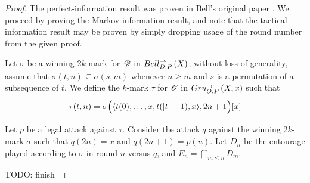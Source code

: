 \documentclass{amsart}
\theoremstyle{definition}
\begin{document}
  \begin{proof}
    The perfect-information result was proven in Bell's
    original paper \cite{MR3239205}. We proceed by proving the
    Markov-information result, and note that the tactical-information
    result may be proven by simply dropping usage of
    the round number from the given proof.

    Let \(\sigma\) be a winning \(2k\)-mark for \(\mathscr{D}\) in
    \(Bell_{D,P}^{\rightharpoonup}\left({X}\right)\); without loss of generality, assume that
    \(\sigma(t,n)\subseteq\sigma(s,m)\) whenever \(n\geq m\) and
    \(s\) is a permutation of a subsequence of \(t\).
    We define the \(k\)-mark \(\tau\) for \(\mathscr{O}\) in
    \(Gru_{O,P}^{\to}\left({X},{x}\right)\) such that
      \[
        \tau(t,n)
          =
        \sigma\Big(\langle t(0),\dots,x,t(|t|-1),x\rangle,2n+1\Big)[x]
      \]

    Let \(p\) be a legal attack against \(\tau\).
    Consider the attack \(q\) against the winning \(2k\)-mark
    \(\sigma\) such that \(q(2n)=x\) and \(q(2n+1)=p(n)\).
    Let \(D_n\) be the entourage played according to \(\sigma\)
    in round \(n\) versus \(q\), and \(E_n=\bigcap_{m\leq n}D_m\).

    TODO: finish


  \end{proof}
\end{document}

